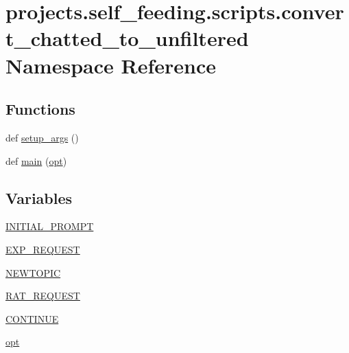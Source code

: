 \hypertarget{namespaceprojects_1_1self__feeding_1_1scripts_1_1convert__chatted__to__unfiltered}{}\section{projects.\+self\+\_\+feeding.\+scripts.\+convert\+\_\+chatted\+\_\+to\+\_\+unfiltered Namespace Reference}
\label{namespaceprojects_1_1self__feeding_1_1scripts_1_1convert__chatted__to__unfiltered}
\subsection*{Functions}
\begin{DoxyCompactItemize}
\item 
def \hyperlink{namespaceprojects_1_1self__feeding_1_1scripts_1_1convert__chatted__to__unfiltered_a0c8516f372e45778279d5e8dd120d508}{setup\+\_\+args} ()
\item 
def \hyperlink{namespaceprojects_1_1self__feeding_1_1scripts_1_1convert__chatted__to__unfiltered_a1fc60d6ff016ace4fb6d348542ae6e86}{main} (\hyperlink{namespaceprojects_1_1self__feeding_1_1scripts_1_1convert__chatted__to__unfiltered_a71704466ed2361d7eaaeca75661ba325}{opt})
\end{DoxyCompactItemize}
\subsection*{Variables}
\begin{DoxyCompactItemize}
\item 
\hyperlink{namespaceprojects_1_1self__feeding_1_1scripts_1_1convert__chatted__to__unfiltered_a2a2060a0b2c5986c6ca31f9f298d15cc}{I\+N\+I\+T\+I\+A\+L\+\_\+\+P\+R\+O\+M\+PT}
\item 
\hyperlink{namespaceprojects_1_1self__feeding_1_1scripts_1_1convert__chatted__to__unfiltered_a84063a7656fa650ee9a41447242b26fe}{E\+X\+P\+\_\+\+R\+E\+Q\+U\+E\+ST}
\item 
\hyperlink{namespaceprojects_1_1self__feeding_1_1scripts_1_1convert__chatted__to__unfiltered_aa470b1da841a299443747765a423b7ff}{N\+E\+W\+T\+O\+P\+IC}
\item 
\hyperlink{namespaceprojects_1_1self__feeding_1_1scripts_1_1convert__chatted__to__unfiltered_ad5a8bb2712b5621f39e1e3b4dc89a97e}{R\+A\+T\+\_\+\+R\+E\+Q\+U\+E\+ST}
\item 
\hyperlink{namespaceprojects_1_1self__feeding_1_1scripts_1_1convert__chatted__to__unfiltered_ac8142342b1bf465261b17dd5b788557e}{C\+O\+N\+T\+I\+N\+UE}
\item 
\hyperlink{namespaceprojects_1_1self__feeding_1_1scripts_1_1convert__chatted__to__unfiltered_a71704466ed2361d7eaaeca75661ba325}{opt}
\end{DoxyCompactItemize}


